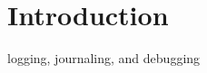 \hypertarget{index_Introduction}{}\section{Introduction}\label{index_Introduction}
logging, journaling, and debugging

 